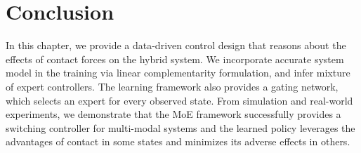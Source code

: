 \section{Conclusion}
\label{sec:moe_conclusion}

In this chapter, we provide a data-driven control design that reasons about the
effects of contact forces on the hybrid system.
%
We incorporate accurate system model in the training via linear complementarity
formulation, and infer mixture of expert controllers.
%
The learning framework also provides a gating network, which selects an expert
for every observed state.
%
From simulation and real-world experiments, we demonstrate that the MoE
framework successfully provides a switching controller for multi-modal systems
and the learned policy leverages the advantages of contact in some states and
minimizes its adverse effects in others.
%
